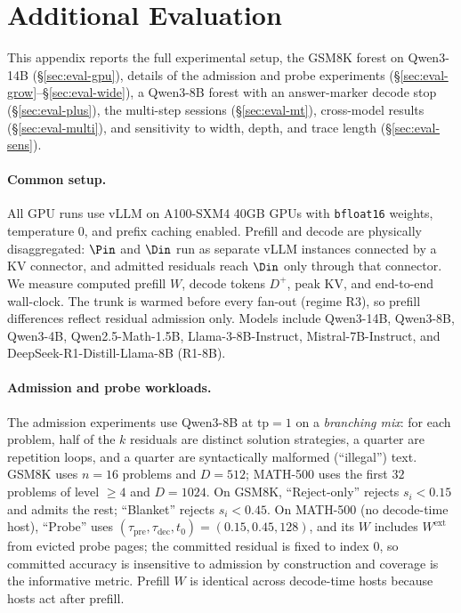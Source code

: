 \section{Additional Evaluation}
\label{sec:eval-full}

This appendix reports the full experimental setup, the GSM8K forest on Qwen3-14B (\S\ref{sec:eval-gpu}), details of the admission and probe experiments (\S\ref{sec:eval-grow}--\S\ref{sec:eval-wide}), a Qwen3-8B forest with an answer-marker decode stop (\S\ref{sec:eval-plus}), the multi-step sessions (\S\ref{sec:eval-mt}), cross-model results (\S\ref{sec:eval-multi}), and sensitivity to width, depth, and trace length (\S\ref{sec:eval-sens}).

\paragraph{Common setup.}
\label{sec:eval-setup}
All GPU runs use vLLM on A100-SXM4 40GB GPUs with \texttt{bfloat16} weights, temperature $0$, and prefix caching enabled.
Prefill and decode are physically disaggregated: $\Pin$ and $\Din$ run as separate vLLM instances connected by a KV connector, and admitted residuals reach $\Din$ only through that connector.
We measure computed prefill $W$, decode tokens $D^{+}$, peak KV, and end-to-end wall-clock.
The trunk is warmed before every fan-out (regime R3), so prefill differences reflect residual admission only.
Models include Qwen3-14B, Qwen3-8B, Qwen3-4B, Qwen2.5-Math-1.5B, Llama-3-8B-Instruct, Mistral-7B-Instruct, and DeepSeek-R1-Distill-Llama-8B (R1-8B).

\paragraph{Admission and probe workloads.}
The admission experiments use Qwen3-8B at $\mathrm{tp}{=}1$ on a \emph{branching mix}: for each problem, half of the $k$ residuals are distinct solution strategies, a quarter are repetition loops, and a quarter are syntactically malformed (``illegal'') text.
GSM8K uses $n{=}16$ problems and $D{=}512$; MATH-500 uses the first $32$ problems of level $\ge4$ and $D{=}1024$.
On GSM8K, ``Reject-only'' rejects $s_i{<}0.15$ and admits the rest; ``Blanket'' rejects $s_i{<}0.45$.
On MATH-500 (no decode-time host), ``Probe'' uses $(\tau_{\mathrm{pre}},\tau_{\mathrm{dec}},t_0)=(0.15,0.45,128)$, and its $W$ includes $W^{\mathrm{ext}}$ from evicted probe pages; the committed residual is fixed to index $0$, so committed accuracy is insensitive to admission by construction and coverage is the informative metric.
Prefill $W$ is identical across decode-time hosts because hosts act after prefill.

